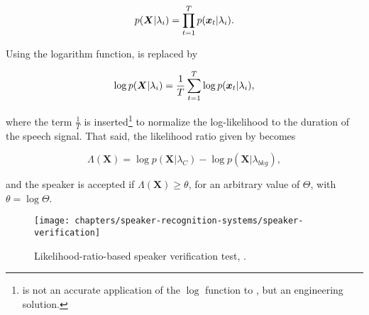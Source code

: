\begin{equation}
    p(\boldsymbol{X}|\lambda_i) = \prod_{t=1}^T p(\dvec{x}_t|\lambda_i).
    \label{eq:likelihood-prod}
\end{equation}

\noindent Using the logarithm function,  is replaced by

\begin{equation}
    \log p(\boldsymbol{X}|\lambda_i) = \frac{1}{T} \sum_{t=1}^T \log p(\dvec{x}_t|\lambda_i),
    \label{eq:log-likelihood-sum}
\end{equation}

\noindent where the term $\frac{1}{T}$ is inserted\footnote{ is not an accurate application of the $\log$ function to , but an engineering solution.} to normalize the log-likelihood to the duration of the speech signal. That said, the likelihood ratio given by  becomes

\begin{equation}
    \Lambda(\boldsymbol{X}) = \log p(\boldsymbol{X}|\lambda_{C}) - \log p(\boldsymbol{X}|\lambda_{bkg}),
    \label{eq:score_of_X}
\end{equation}

\noindent and the speaker is accepted if $\Lambda(\boldsymbol{X}) \geq \theta$, for an arbitrary value of $\Theta$, with $\theta = \log\Theta$.

\begin{figure}[ht]
    \centering
    \texttt{[image: chapters/speaker-recognition-systems/speaker-verification]}
    \caption{Likelihood-ratio-based speaker verification test, .}
    \label{fig:speaker-verification}
\end{figure}